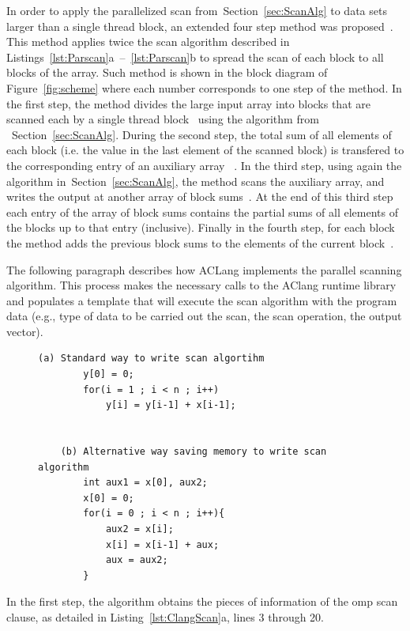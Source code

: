 \documentclass[Ingles]{ic-tese-v1}
\newcommand{\rsec}[1]{Section~\ref{sec:#1}}
\newcommand{\rfig}[1]{Figure~\ref{fig:#1}}
\newcommand{\rlst}[1]{Listing~\ref{lst:#1}}
\newcommand{\rlstn}[3]{Listings~\ref{lst:#1}{#2}~--~\ref{lst:#1}{#3}}
\begin{document}
In order to apply the  parallelized scan from~\rsec{ScanAlg} to data sets
larger than  a single thread block,  an extended four step  method was
proposed~\cite{harris2007parallel}. This method applies twice the  scan
algorithm described in \rlstn{Parscan}{a}{b} to spread the scan of each
block to all blocks  of the array.  Such method is  shown in the block
diagram of \rfig{scheme} where each  number corresponds to one step of
the method.   In the first  step, the  method divides the  large input
array  into  blocks  that  are   scanned  each  by  a  single  thread
block~ using  the algorithm  from ~\rsec{ScanAlg}.   During the
second step,  the total sum  of all elements  of each block  (i.e. the
value in the  last element of the scanned block)  is transfered to the
corresponding entry of  an auxiliary array ~.   In the third
step, using again  the algorithm in~\rsec{ScanAlg}, the  method scans the
auxiliary  array, and  writes the  output  at another  array of  block
sums~.  At  the end  of this  third step  each entry  of the
array of block  sums contains the partial sums of  all elements of the
blocks up to that entry (inclusive).   Finally in the fourth step,
for each block the method adds the previous block sums  to the elements of the current
block~.

The following paragraph describes how ACLang implements the parallel scanning algorithm. This process makes the necessary calls to the AClang runtime library and populates a template that will execute the scan algorithm with the program data (e.g., type of data to be carried out the scan, the scan operation, the output vector).

\begin{figure}[t]
	\lstset{basicstyle=\scriptsize}
	\begin{lstlisting}[label=lst:ScanKind, caption={Pseudocode of Scan Parallel implementation in Aclang}, escapeinside={}]
	(a) Standard way to write scan algortihm
		y[0] = 0;
		for(i = 1 ; i < n ; i++)
			y[i] = y[i-1] + x[i-1];


	(b) Alternative way saving memory to write scan algorithm
		int aux1 = x[0], aux2;
		x[0] = 0;
		for(i = 0 ; i < n ; i++){
			aux2 = x[i];
			x[i] = x[i-1] + aux;
			aux = aux2;
		}

	\end{lstlisting}
\end{figure}

In the first step, the algorithm obtains the pieces of information of the
omp scan clause, as detailed in \rlst{ClangScan}{a}, lines 3 through
20.
\end{document}
